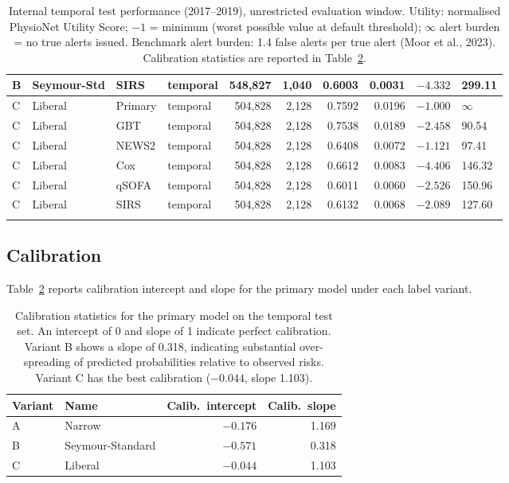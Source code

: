 \begin{landscape}
\begin{longtable}{llllrrrrrl}
  B & Seymour-Std & SIRS   & temporal & 548{,}827 & 1{,}040
    & 0.6003 & 0.0031 & $-4.332$ & 299.11 \\
  \midrule
  C & Liberal & Primary & temporal & 504{,}828 & 2{,}128
    & 0.7592 & 0.0196 & $-1.000$ & $\infty$ \\
  C & Liberal & GBT     & temporal & 504{,}828 & 2{,}128
    & 0.7538 & 0.0189 & $-2.458$ & 90.54 \\
  C & Liberal & NEWS2   & temporal & 504{,}828 & 2{,}128
    & 0.6408 & 0.0072 & $-1.121$ & 97.41 \\
  C & Liberal & Cox     & temporal & 504{,}828 & 2{,}128
    & 0.6612 & 0.0083 & $-4.406$ & 146.32 \\
  C & Liberal & qSOFA  & temporal & 504{,}828 & 2{,}128
    & 0.6011 & 0.0060 & $-2.526$ & 150.96 \\
  C & Liberal & SIRS   & temporal & 504{,}828 & 2{,}128
    & 0.6132 & 0.0068 & $-2.089$ & 127.60 \\
  \bottomrule
  \caption{Internal temporal test performance (2017--2019), unrestricted evaluation
  window. Utility: normalised PhysioNet Utility Score; $-1$ = minimum (worst possible
  value at default threshold); $\infty$ alert burden = no true alerts issued. Benchmark
  alert burden: 1.4 false alerts per true alert (Moor et al., 2023). Calibration
  statistics are reported in Table~\ref{tab:calibration}.}
  \label{tab:internal_results}
\end{longtable}
\end{landscape}

\subsection{Calibration}
\label{subsec:calibration}

Table~\ref{tab:calibration} reports calibration intercept and slope for the
primary model under each label variant.

\begin{table}[H]
  \centering
  \begin{tabular}{llrr}
    \toprule
    \textbf{Variant} & \textbf{Name} & \textbf{Calib.\ intercept} & \textbf{Calib.\ slope} \\
    \midrule
    A & Narrow           & $-0.176$ & 1.169 \\
    B & Seymour-Standard & $-0.571$ & 0.318 \\
    C & Liberal          & $-0.044$ & 1.103 \\
    \bottomrule
  \end{tabular}
  \caption{Calibration statistics for the primary model on the temporal test set.
  An intercept of 0 and slope of 1 indicate perfect calibration. Variant B
  shows a slope of 0.318, indicating substantial over-spreading of predicted
  probabilities relative to observed risks. Variant C has the best calibration
  ($-0.044$, slope 1.103).}
  \label{tab:calibration}
\end{table}

